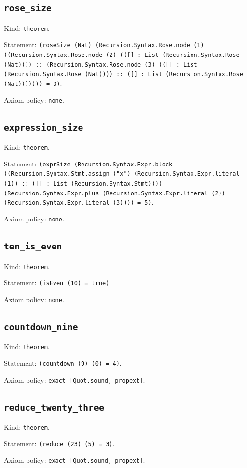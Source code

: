 \documentclass[11pt]{article}
\begin{document}
\subsection*{\texttt{rose\_size}}
\noindent Kind: \texttt{theorem}.\par
\noindent Statement: \texttt{(roseSize (Nat) (Recursion.Syntax.Rose.node (1) ((Recursion.Syntax.Rose.node (2) (([] : List (Recursion.Syntax.Rose (Nat)))) :: (Recursion.Syntax.Rose.node (3) (([] : List (Recursion.Syntax.Rose (Nat)))) :: ([] : List (Recursion.Syntax.Rose (Nat))))))) = 3)}.\par
\noindent Axiom policy: \texttt{none}.\par
\subsection*{\texttt{expression\_size}}
\noindent Kind: \texttt{theorem}.\par
\noindent Statement: \texttt{(exprSize (Recursion.Syntax.Expr.block ((Recursion.Syntax.Stmt.assign ("x") (Recursion.Syntax.Expr.literal (1)) :: ([] : List (Recursion.Syntax.Stmt)))) (Recursion.Syntax.Expr.plus (Recursion.Syntax.Expr.literal (2)) (Recursion.Syntax.Expr.literal (3)))) = 5)}.\par
\noindent Axiom policy: \texttt{none}.\par
\subsection*{\texttt{ten\_is\_even}}
\noindent Kind: \texttt{theorem}.\par
\noindent Statement: \texttt{(isEven (10) = true)}.\par
\noindent Axiom policy: \texttt{none}.\par
\subsection*{\texttt{countdown\_nine}}
\noindent Kind: \texttt{theorem}.\par
\noindent Statement: \texttt{(countdown (9) (0) = 4)}.\par
\noindent Axiom policy: \texttt{exact [Quot.sound, propext]}.\par
\subsection*{\texttt{reduce\_twenty\_three}}
\noindent Kind: \texttt{theorem}.\par
\noindent Statement: \texttt{(reduce (23) (5) = 3)}.\par
\noindent Axiom policy: \texttt{exact [Quot.sound, propext]}.\par
\end{document}
